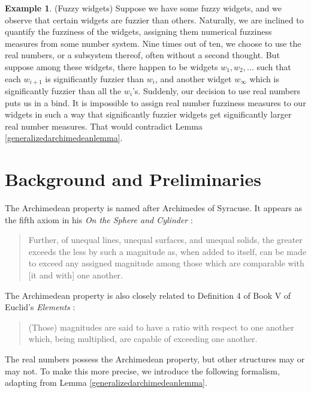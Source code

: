 \documentclass[reqno]{article}
\theoremstyle{definition}
\newtheorem{example}[theorem]{Example}
\begin{document}
\begin{example}
\label{fuzzywidgets}
(Fuzzy widgets)
Suppose we have some fuzzy widgets, and we observe that certain
widgets are fuzzier than others. Naturally, we are inclined to
quantify the fuzziness of the widgets, assigning them numerical
fuzziness measures from some number system. Nine times out of ten,
we choose to use the real numbers, or a subsystem thereof,
often without a second thought. But suppose
among these widgets, there happen to be widgets $w_1,w_2,\ldots$
such that each $w_{i+1}$ is significantly fuzzier than $w_i$,
and another widget $w_\infty$ which is significantly fuzzier than all the $w_i$'s.
Suddenly, our decision to use real numbers puts us in a bind.
It is impossible to assign real number fuzziness measures to our
widgets in such a way that significantly fuzzier widgets get
significantly larger real number measures. That would
contradict Lemma \ref{generalizedarchimedeanlemma}.
\end{example}



\section{Background and Preliminaries}

The Archimedean property is named after Archimedes of Syracuse.
It appears as the fifth axiom in his \emph{On the Sphere
and Cylinder} \cite{archimedes}:
\begin{quote}
    Further, of unequal lines, unequal surfaces, and unequal
    solids, the greater exceeds the less by such a magnitude
    as, when added to itself, can be made to exceed any
    assigned magnitude among those which are comparable with
    [it and with] one another.
\end{quote}
The Archimedean property is also closely related to Definition 4 of Book V of Euclid's
\emph{Elements} \cite{euclid}:
\begin{quote}
    (Those) magnitudes are said to have a ratio
    with respect to one another which, being
    multiplied, are capable of exceeding one
    another.
\end{quote}

The real numbers possess the Archimedean property, but other structures
may or may not. To make this more precise,
we introduce the following formalism, adapting from Lemma \ref{generalizedarchimedeanlemma}.
\end{document}
